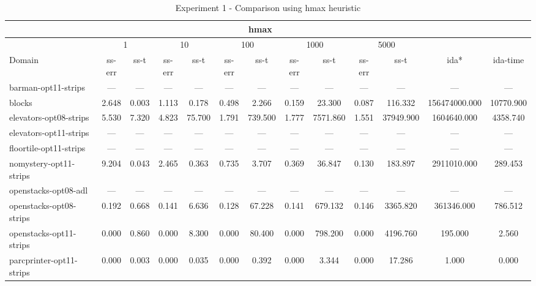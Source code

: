 \documentclass[a4paper,12pt]{article}
\begin{document}
\begin{table}[]
\footnotesize\setlength{\tabcolsep}{1.8pt}
\caption{Experiment 1 - Comparison using hmax heuristic}
\label{my-label}
\begin{tabular}{l@{\hspace{6pt}} *{12}{c}}
\hline
                                                        & \multicolumn{10}{c}{hmax}                                                                                                          & \multicolumn{2}{l}{}      \\ \hline

                  & \multicolumn{2}{c|}{1} & \multicolumn{2}{c|}{10} & \multicolumn{2}{c|}{100} & \multicolumn{2}{c|}{1000} & \multicolumn{2}{c|}{5000}                   \\ \hline
Domain                  & ss-err  & ss-t  & ss-err  & ss-t  & ss-err  & ss-t  & ss-err  & ss-t  & ss-err  & ss-t  & ida*  & ida-time  \\ \hline
barman-opt11-strips     & --- & --- & --- & --- & --- & --- & --- & --- & --- & --- & --- & --- \\ \hline
blocks                  & 2.648 & 0.003 & 1.113 & 0.178 & 0.498 & 2.266 & 0.159 & 23.300 & 0.087 & 116.332 & 156474000.000 & 10770.900 \\ \hline
elevators-opt08-strips  & 5.530 & 7.320 & 4.823 & 75.700 & 1.791 & 739.500 & 1.777 & 7571.860 & 1.551 & 37949.900 & 1604640.000 & 4358.740 \\ \hline
elevators-opt11-strips  & --- & --- & --- & --- & --- & --- & --- & --- & --- & --- & --- & --- \\ \hline
floortile-opt11-strips  & --- & --- & --- & --- & --- & --- & --- & --- & --- & --- & --- & --- \\ \hline
nomystery-opt11-strips  & 9.204 & 0.043 & 2.465 & 0.363 & 0.735 & 3.707 & 0.369 & 36.847 & 0.130 & 183.897 & 2911010.000 & 289.453 \\ \hline
openstacks-opt08-adl    & --- & --- & --- & --- & --- & --- & --- & --- & --- & --- & --- & --- \\ \hline
openstacks-opt08-strips & 0.192 & 0.668 & 0.141 & 6.636 & 0.128 & 67.228 & 0.141 & 679.132 & 0.146 & 3365.820 & 361346.000 & 786.512 \\ \hline
openstacks-opt11-strips & 0.000 & 0.860 & 0.000 & 8.300 & 0.000 & 80.400 & 0.000 & 798.200 & 0.000 & 4196.760 & 195.000 & 2.560 \\ \hline
parcprinter-opt11-strips& 0.000 & 0.003 & 0.000 & 0.035 & 0.000 & 0.392 & 0.000 & 3.344 & 0.000 & 17.286 & 1.000 & 0.000 \\ \hline

\end{tabular}
\end{table}
\end{document}
